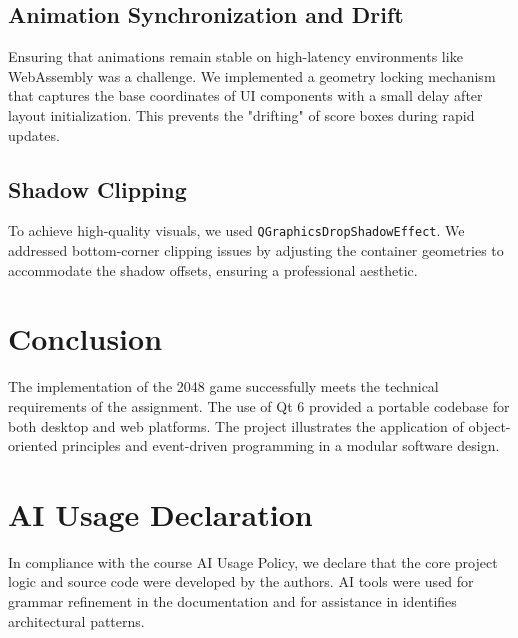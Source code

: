 \documentclass[11pt,a4paper]{article}
\begin{document}
\subsection{Animation Synchronization and Drift}
Ensuring that animations remain stable on high-latency environments like WebAssembly was a challenge. We implemented a geometry locking mechanism that captures the base coordinates of UI components with a small delay after layout initialization. This prevents the "drifting" of score boxes during rapid updates.

\subsection{Shadow Clipping}
To achieve high-quality visuals, we used \texttt{QGraphicsDropShadowEffect}. We addressed bottom-corner clipping issues by adjusting the container geometries to accommodate the shadow offsets, ensuring a professional aesthetic.

\section{Conclusion}
The implementation of the 2048 game successfully meets the technical requirements of the assignment. The use of Qt 6 provided a portable codebase for both desktop and web platforms. The project illustrates the application of object-oriented principles and event-driven programming in a modular software design.

\section*{AI Usage Declaration}
In compliance with the course AI Usage Policy, we declare that the core project logic and source code were developed by the authors. AI tools were used for grammar refinement in the documentation and for assistance in identifies architectural patterns.
\end{document}
